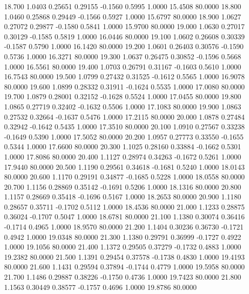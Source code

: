   18.700   1.0403   0.25651   0.29155  -0.1560   0.5995   1.0000  15.4508  80.0000
  18.800   1.0460   0.25868   0.29449  -0.1566   0.5927   1.0000  15.6797  80.0000
  18.900   1.0627   0.27072   0.29877  -0.1580   0.5841   1.0000  15.9700  80.0000
  19.000   1.0630   0.27017   0.30129  -0.1585   0.5819   1.0000  16.0446  80.0000
  19.100   1.0602   0.26608   0.30339  -0.1587   0.5790   1.0000  16.1420  80.0000
  19.200   1.0601   0.26403   0.30576  -0.1590   0.5736   1.0000  16.3271  80.0000
  19.300   1.0637   0.26475   0.30852  -0.1596   0.5668   1.0000  16.5561  80.0000
  19.400   1.0703   0.26791   0.31167  -0.1603   0.5610   1.0000  16.7543  80.0000
  19.500   1.0799   0.27432   0.31525  -0.1612   0.5565   1.0000  16.9078  80.0000
  19.600   1.0899   0.28332   0.31911  -0.1624   0.5535   1.0000  17.0080  80.0000
  19.700   1.0879   0.28001   0.32152  -0.1628   0.5524   1.0000  17.0455  80.0000
  19.800   1.0865   0.27719   0.32402  -0.1632   0.5506   1.0000  17.1083  80.0000
  19.900   1.0863   0.27532   0.32664  -0.1637   0.5476   1.0000  17.2115  80.0000
  20.000   1.0878   0.27484   0.32942  -0.1642   0.5435   1.0000  17.3510  80.0000
  20.100   1.0910   0.27567   0.33238  -0.1649   0.5390   1.0000  17.5052  80.0000
  20.200   1.0957   0.27773   0.33550  -0.1655   0.5344   1.0000  17.6600  80.0000
  20.300   1.1025   0.28160   0.33884  -0.1662   0.5301   1.0000  17.8086  80.0000
  20.400   1.1127   0.28974   0.34263  -0.1672   0.5261   1.0000  17.9440  80.0000
  20.500   1.1190   0.29561   0.34618  -0.1681   0.5240   1.0000  18.0143  80.0000
  20.600   1.1170   0.29191   0.34877  -0.1685   0.5228   1.0000  18.0558  80.0000
  20.700   1.1156   0.28869   0.35142  -0.1691   0.5206   1.0000  18.1316  80.0000
  20.800   1.1157   0.28669   0.35418  -0.1696   0.5167   1.0000  18.2653  80.0000
  20.900   1.1180   0.28657   0.35711  -0.1702   0.5112   1.0000  18.4536  80.0000
  21.000   1.1233   0.28875   0.36024  -0.1707   0.5047   1.0000  18.6781  80.0000
  21.100   1.1380   0.30074   0.36416  -0.1714   0.4965   1.0000  18.9570  80.0000
  21.200   1.1404   0.30236   0.36730  -0.1721   0.4942   1.0000  19.0348  80.0000
  21.300   1.1380   0.29791   0.36999  -0.1727   0.4922   1.0000  19.1056  80.0000
  21.400   1.1372   0.29505   0.37279  -0.1732   0.4883   1.0000  19.2382  80.0000
  21.500   1.1391   0.29454   0.37578  -0.1738   0.4830   1.0000  19.4193  80.0000
  21.600   1.1431   0.29594   0.37894  -0.1744   0.4779   1.0000  19.5958  80.0000
  21.700   1.1486   0.29887   0.38226  -0.1750   0.4736   1.0000  19.7423  80.0000
  21.800   1.1563   0.30449   0.38577  -0.1757   0.4696   1.0000  19.8786  80.0000
